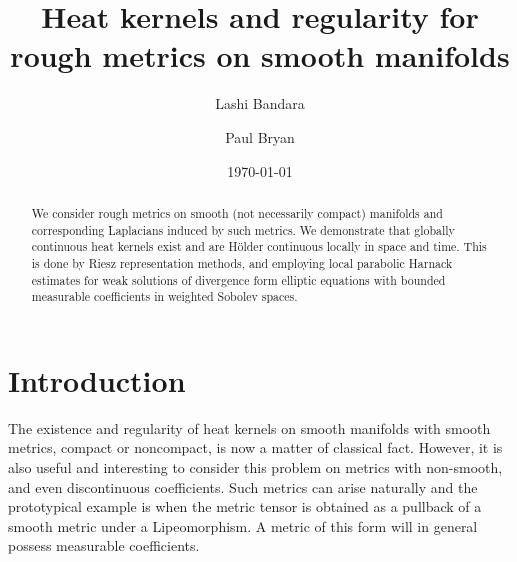 \documentclass[a4paper, 12pt]{amsart}
\begin{document}
\title[Heat kernels and regularity for rough metrics]{Heat kernels and regularity for rough metrics on smooth manifolds}

\author{Lashi Bandara}
\author{Paul Bryan}

\address{Lashi Bandara, 
Institut für Mathematik,
Universität Potsdam, 
D-14476, Potsdam OT Golm, Germany
}

\address{Paul Bryan, 
School of Mathematics and Physics
The University of Queensland
Brisbane QLD 4072, Australia
}


\curraddr{}
\email{}
\date{\today}

\dedicatory{}

\maketitle

\begin{abstract}
We consider rough metrics on smooth (not necessarily compact) manifolds and corresponding Laplacians
induced by such metrics. We demonstrate that globally continuous heat kernels exist and are Hölder continuous locally in space and time.
This is done by Riesz representation methods, and employing
local parabolic Harnack estimates for weak solutions of divergence form elliptic equations with bounded
measurable coefficients in weighted Sobolev spaces.
\end{abstract}

\setcounter{tocdepth}{1}
\tableofcontents

\parindent0cm
\setlength{\parskip}{\baselineskip}



\section{Introduction}
\label{sec:intro}
The existence and regularity of heat kernels on smooth manifolds with smooth metrics, compact or noncompact, 
is now a matter of classical fact. 
However, it is also useful and interesting to consider this problem on
metrics with non-smooth, and even discontinuous coefficients. 
Such metrics can arise naturally and the prototypical example 
is when the metric tensor is obtained as a pullback of a smooth metric under a 
Lipeomorphism. A metric of this form will in general possess measurable
coefficients.
\end{document}
